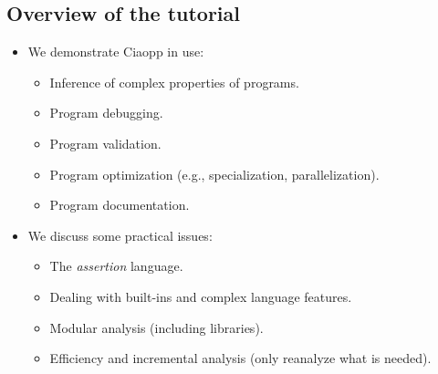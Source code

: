 \documentclass{article}
\renewcommand{\_}{\char'137}
\begin{document}
\begin{itemize}

\end{itemize}

\subsection{Overview of the tutorial}

\begin{itemize}
\item We demonstrate Ciaopp in use:
  \begin{itemize}
  \item Inference of complex properties of programs.
  \item Program debugging.
  \item Program validation.
  \item Program optimization (e.g., specialization, parallelization).
  \item Program documentation. 
  \end{itemize}

\item We discuss some practical issues:
  \begin{itemize}
  \item The \emph{assertion} language.
  \item Dealing with built-ins and complex language features.
  \item Modular analysis (including libraries).
  \item Efficiency and incremental analysis (only reanalyze what is needed).
  \end{itemize}

\end{itemize}
\end{document}
